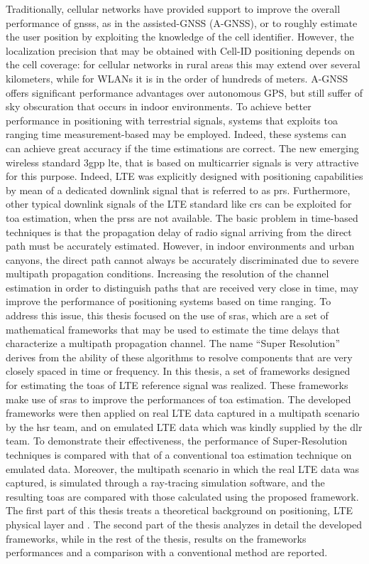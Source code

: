 Traditionally, cellular networks have provided support to improve the overall 
performance of \glspl{gnss}, as in the assisted-GNSS (A-GNSS), or to roughly estimate the user 
position by exploiting the knowledge of the cell identifier.
However, the localization precision that may be obtained with Cell-ID positioning depends on 
the cell coverage: for cellular networks in rural areas this may extend over several kilometers, 
while for WLANs it is in the order of hundreds of meters. A-GNSS offers significant performance 
advantages over autonomous GPS, but still suffer of sky obscuration 
that occurs in indoor environments. 
To achieve better performance in positioning with terrestrial signals, systems that exploits 
\gls{toa} ranging  time measurement-based may be employed. Indeed, these systems can can achieve 
great accuracy if the time estimations are correct.
The new emerging wireless standard \gls{3gpp} \gls{lte}, that is based on multicarrier signals is 
very attractive for this purpose. Indeed, LTE was explicitly designed with positioning capabilities by mean of a 
dedicated downlink signal that is referred to as \gls{prs}. Furthermore, other typical downlink signals of the
LTE standard like \gls{crs} can be exploited for \gls{toa} estimation, when the \glspl{prs} are not available.
The basic problem in time-based techniques is that the propagation delay of radio signal arriving from 
the direct path must be accurately estimated. However, in indoor environments and urban canyons, 
the direct path cannot always be accurately discriminated due to severe multipath propagation conditions.
Increasing the resolution of the channel estimation in order to distinguish paths that are received 
very close in time, may improve the performance of positioning systems based on time ranging. 
To address this issue, this thesis focused on the use of \glspl{sra}, which are a set of mathematical 
frameworks that may be used to estimate the time delays that characterize a multipath propagation 
channel. The name ``Super Resolution'' derives from the ability of these algorithms to resolve components 
that are very closely spaced in time or frequency.
In this thesis, a set of frameworks designed for estimating the \glspl{toa} of LTE reference 
signal was realized.
These frameworks make use of \glspl{sra} to improve the performances of \gls{toa}
estimation. The developed frameworks were then applied on real LTE data captured in a multipath scenario 
by the \gls{hsr} team, and on emulated LTE data which was kindly supplied by the \gls{dlr} team. 
To demonstrate their effectiveness, the performance of Super-Resolution techniques 
is compared with that of a conventional \gls{toa} estimation technique on emulated data. 
Moreover, the multipath scenario in which the real LTE data was captured, is simulated through a 
ray-tracing simulation software, and the resulting \glspl{toa} are compared with those calculated
using the proposed framework.
The first part of this thesis treats a theoretical background on positioning, LTE physical layer and . The second part of the thesis analyzes in detail the developed frameworks, while in 
the rest of the thesis, results on the frameworks performances and a comparison with a conventional method 
are reported.

